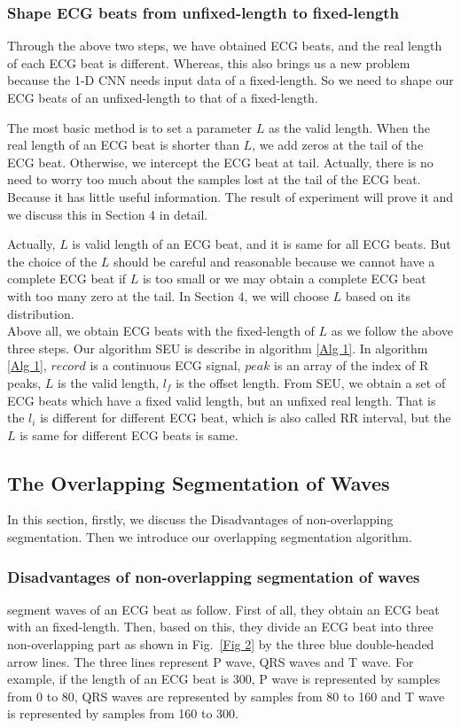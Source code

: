 \documentclass[wcp]{jmlr}
\begin{document}
\subsubsection{Shape ECG beats from unfixed-length to fixed-length}
Through the above two steps, we have obtained ECG beats, and the real length of each ECG beat is different. Whereas, this also brings us a new problem because the 1-D CNN needs input data of a fixed-length. So we need to shape our ECG beats of an unfixed-length to that of a fixed-length.


The most basic method is to set a parameter $L$ as the valid length. When the real length of an ECG beat is shorter than $L$, we add zeros at the tail of the ECG beat. Otherwise, we intercept the ECG beat at tail. Actually, there is no need to worry too much about the samples lost at the tail of the ECG beat. Because it has little useful information. The result of experiment will prove it and we discuss this in Section 4 in detail. 


Actually, $L$ is valid length of an ECG beat, and it is same for all ECG beats. But the choice of the $L$ should be careful and reasonable because we cannot have a complete ECG beat if $L$ is too small or we may obtain a complete ECG beat with too many zero at the tail. In Section 4, we will choose $L$ based on its distribution.\\


Above all, we obtain ECG beats with the fixed-length of $L$ as we follow the above three steps. Our algorithm SEU is describe in algorithm \ref{Alg 1}. In algorithm \ref{Alg 1}, $record$ is a continuous ECG signal, $peak$ is an array of the index of R peaks, $L$ is the valid length, $l_f$ is the offset length. From SEU, we obtain a set of ECG beats which have a fixed valid length, but an unfixed real length. That is the $l_i$ is different for different ECG beat, which is also called RR interval, but the $L$ is same for different ECG beats is same.
\subsection{The Overlapping Segmentation of Waves}
In this section, firstly, we discuss the Disadvantages of non-overlapping segmentation. Then we introduce our overlapping segmentation algorithm.
\subsubsection{Disadvantages of non-overlapping segmentation of waves}
\cite{xiang2018ecg} segment waves of an ECG beat as follow. First of all, they obtain an ECG beat with an fixed-length. Then, based on this, they divide an ECG beat into three non-overlapping part as shown in Fig.~\ref{Fig 2} by the three blue double-headed arrow lines. The three lines represent P wave, QRS waves and T wave. For example, if the length of an ECG beat is 300, P wave is represented by samples from 0 to 80, QRS waves are represented by samples from 80 to 160 and T wave is represented by samples from 160 to 300. 
\end{document}

